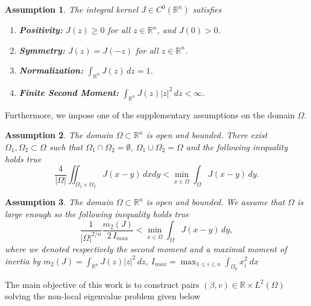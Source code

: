 \documentclass[11pt, a4paper]{article}
\theoremstyle{break}
\theoremstyle{break}
\theoremstyle{break}
\newtheorem{asm}{Assumption}[section]
\theoremstyle{break}
\theoremstyle{break}
\theoremstyle{break}
\theoremstyle{break}
\theoremstyle{break}
\theoremstyle{break}
\begin{document}
\begin{asm} 
    \label{asm:KernelProperties}
    The integral kernel $J \in C^0(\mathbb{R}^n)$ satisfies
    \begin{enumerate}[label=(\textit{J\arabic*})]
        \item \textbf{Positivity:} $J(z) \geq 0$ for all $z \in \mathbb{R}^n$, and $J(0) > 0$.
        \item \textbf{Symmetry:} $J(z) = J(-z)$ for all $z \in \mathbb{R}^n$.
        \item \textbf{Normalization:} $\int_{\mathbb{R}^n} J(z) \, dz = 1$.
        \item \textbf{Finite Second Moment:} $\int_{\mathbb{R}^n} J(z)|z|^2 \, dz < \infty$.
    \end{enumerate}
\end{asm}

Furthermore, we impose one of the supplementary assumptions on the domain $\Omega$.

\begin{asm}
    \label{asm:DomainProperties_1}
    The domain $\Omega \subset \mathbb{R}^n$ is open and bounded. There exist $\Omega_1, \Omega_2 \subset \Omega$ such that $\Omega_1 \cap \Omega_2 = \emptyset$, $\Omega_1 \cup \Omega_2 = \Omega$ and the following inequality holds true
    \begin{equation}\label{eq:sufficient_cond}
        \frac{4}{|\Omega|} \iint_{\Omega_1 \times \Omega_2} J(x-y) \, dx dy < \min_{x \in \overline{\Omega}} \int_\Omega J(x-y) \, dy.
    \end{equation}
\end{asm}

\begin{asm}
    \label{asm:DomainProperties_2}
    The domain $\Omega \subset \mathbb{R}^n$ is open and bounded. We assume that $\Omega$ is large enough so the following inequality holds true
    \begin{equation} \label{eq:variance_condition}
        \frac{1}{|\Omega|^{2/n}}\frac{m_2(J)}{2 \, I_{max}} < \min_{x \in \overline{\Omega}} \int_\Omega J(x-y) \, dy,
    \end{equation}
    where we denoted respectively the second moment and a maximal moment of inertia by $m_2(J) = \int_{\mathbb{R}^n} J(z)|z|^2 \, dz$, $I_{max} = \max_{1\leq i \leq n} \int_{\Omega_0} x_i^2 \:dx$
\end{asm}

The main objective of this work is to construct pairs $(\beta, v) \in \mathbb{R}\times L^2(\Omega)$ solving the non-local eigenvalue problem given below
\end{document}

